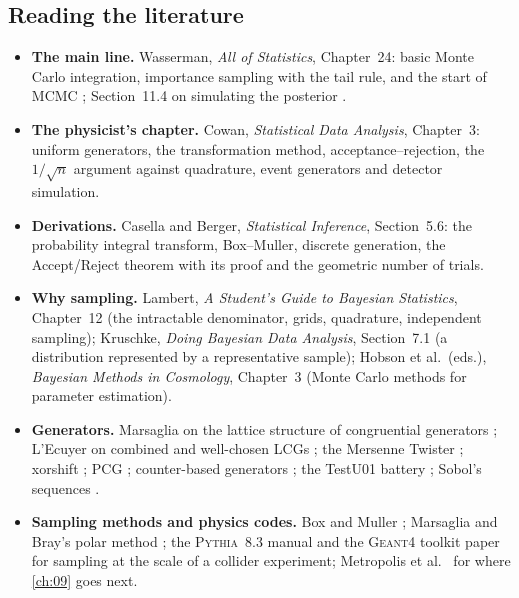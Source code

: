 \subsection*{Reading the literature}
\label{6b:sec:reading-list}

\begin{itemize}[itemsep=2pt,leftmargin=1.2em]
  \item \textbf{The main line.} Wasserman, \emph{All of Statistics}, Chapter~24: basic Monte
        Carlo integration, importance sampling with the tail rule, and the start of MCMC
        ; Section~11.4 on simulating the posterior .
  \item \textbf{The physicist's chapter.} Cowan, \emph{Statistical Data Analysis}, Chapter~3:
        uniform generators, the transformation method, acceptance--rejection, the $1/\sqrt n$
        argument against quadrature, event generators and detector simulation.
  \item \textbf{Derivations.} Casella and Berger, \emph{Statistical Inference}, Section~5.6:
        the probability integral transform, Box--Muller, discrete generation, the Accept/Reject
        theorem with its proof and the geometric number of trials.
  \item \textbf{Why sampling.} Lambert, \emph{A Student's Guide to Bayesian Statistics},
        Chapter~12 (the intractable denominator, grids, quadrature, independent sampling);
        Kruschke, \emph{Doing Bayesian Data Analysis}, Section~7.1 (a distribution represented
        by a representative sample); Hobson et al.\ (eds.), \emph{Bayesian Methods in
        Cosmology}, Chapter~3 (Monte Carlo methods for parameter estimation).
  \item \textbf{Generators.} Marsaglia on the lattice structure of congruential generators
        \cite{Marsaglia1968}; L'Ecuyer on combined and well-chosen LCGs \cite{LEcuyer1988,LEcuyer1999};
        the Mersenne Twister \cite{MatsumotoNishimura1998}; xorshift \cite{Marsaglia2003};
        PCG \cite{ONeill2014}; counter-based generators \cite{Salmon2011}; the TestU01 battery
        \cite{LEcuyerSimard2007}; Sobol's sequences \cite{Sobol1967}.
  \item \textbf{Sampling methods and physics codes.} Box and Muller \cite{BoxMuller1958};
        Marsaglia and Bray's polar method \cite{MarsagliaBray1964}; the \textsc{Pythia}~8.3 manual
        \cite{Pythia83} and the \textsc{Geant4} toolkit paper \cite{Geant4} for sampling at the
        scale of a collider experiment; Metropolis et al.\ \cite{Metropolis1953} for where
        \cref{ch:09} goes next.
\end{itemize}

